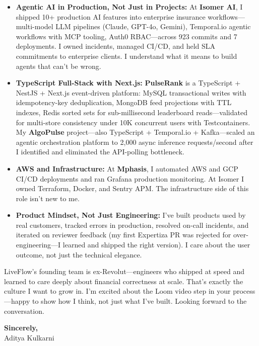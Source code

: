 \documentclass[11pt,letterpaper]{article}
\begin{document}
\begin{itemize}[leftmargin=*, itemsep=3pt, label={\color{LiveFlowGreen}\faAngleRight}]
    \item \textbf{Agentic AI in Production, Not Just in Projects:} At \textbf{Isomer AI}, I shipped 10+ production AI features into enterprise insurance workflows---multi-model LLM pipelines (Claude, GPT-4o, Gemini), Temporal.io agentic workflows with MCP tooling, Auth0 RBAC---across 923 commits and 7 deployments. I owned incidents, managed CI/CD, and held SLA commitments to enterprise clients. I understand what it means to build agents that can't be wrong.

    \item \textbf{TypeScript Full-Stack with Next.js:} \textbf{PulseRank} is a TypeScript + NestJS + Next.js event-driven platform: MySQL transactional writes with idempotency-key deduplication, MongoDB feed projections with TTL indexes, Redis sorted sets for sub-millisecond leaderboard reads---validated for multi-store consistency under 10K concurrent users with Testcontainers. My \textbf{AlgoPulse} project---also TypeScript + Temporal.io + Kafka---scaled an agentic orchestration platform to 2,000 async inference requests/second after I identified and eliminated the API-polling bottleneck.

    \item \textbf{AWS and Infrastructure:} At \textbf{Mphasis}, I automated AWS and GCP CI/CD deployments and ran Grafana production monitoring. At Isomer I owned Terraform, Docker, and Sentry APM. The infrastructure side of this role isn't new to me.

    \item \textbf{Product Mindset, Not Just Engineering:} I've built products used by real customers, tracked errors in production, resolved on-call incidents, and iterated on reviewer feedback (my first Expertiza PR was rejected for over-engineering---I learned and shipped the right version). I care about the user outcome, not just the technical elegance.
\end{itemize}

\vspace{6pt}

LiveFlow's founding team is ex-Revolut---engineers who shipped at speed and learned to care deeply about financial correctness at scale. That's exactly the culture I want to grow in. I'm excited about the Loom video step in your process---happy to show how I think, not just what I've built. Looking forward to the conversation.

\vspace{12pt}

\textbf{Sincerely,}\\[8pt]
Aditya Kulkarni
\end{document}
